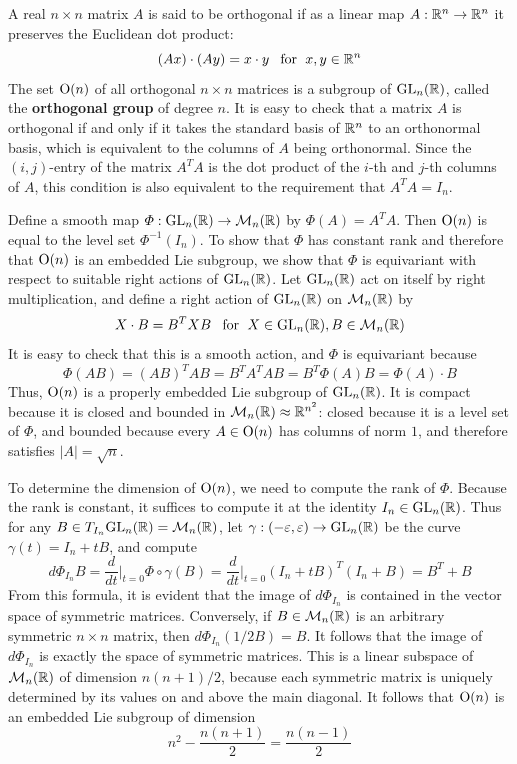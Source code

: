 \begin{example}\label{orthogonal group}
A real $n\times n$ matrix $A$ is said to be orthogonal if as a linear map $A:\mathbb{R}^n\to\mathbb{R}^n$ it preserves the Euclidean dot product:
\[(Ax)\cdot(Ay)=x\cdot y\hspace{8pt}\text{for}\hspace{6pt} x,y\in\mathbb{R}^n\]
The set $\mathrm{O}(n)$ of all orthogonal $n\times n$ matrices is a subgroup of $\mathrm{GL}_n(\mathbb{R})$, called the \textbf{orthogonal group} of degree $n$. It is easy to check that a matrix $A$ is orthogonal if and only if it takes the standard basis of $\mathbb{R}^n$ to an orthonormal basis, which is equivalent to the columns of $A$ being orthonormal. Since the $(i,j)$-entry of the matrix $A^TA$ is the dot product of the $i$-th and $j$-th columns of $A$, this condition is also equivalent to the requirement that $A^TA=I_n$.\par
Define a smooth map $\varPhi:\mathrm{GL}_n(\mathbb{R})\to\mathcal{M}_n(\mathbb{R})$ by $\varPhi(A)=A^TA$. Then $\mathrm{O}(n)$ is equal to the level set $\varPhi^{-1}(I_n)$. To show that $\varPhi$ has constant rank and therefore that $\mathrm{O}(n)$ is an embedded Lie subgroup, we show that $\varPhi$ is equivariant with respect to
suitable right actions of $\mathrm{GL}_n(\mathbb{R})$. Let $\mathrm{GL}_n(\mathbb{R})$ act on itself by right multiplication, and define a right action of $\mathrm{GL}_n(\mathbb{R})$ on $\mathcal{M}_n(\mathbb{R})$ by 
\[X\cdot B=B^TXB\hspace{8pt}\text{for}\hspace{6pt} X\in\mathrm{GL}_n(\mathbb{R}), B\in\mathcal{M}_n(\mathbb{R})\]
It is easy to check that this is a smooth action, and $\varPhi$ is equivariant because
\[\varPhi(AB)=(AB)^TAB=B^TA^TAB=B^T\varPhi(A)B=\varPhi(A)\cdot B\]
Thus, $\mathrm{O}(n)$ is a properly embedded Lie subgroup of $\mathrm{GL}_n(\mathbb{R})$. It is compact because it is closed and bounded in $\mathcal{M}_n(\mathbb{R})\approx\mathbb{R}^{n^2}$: closed because it is a level set of $\varPhi$, and bounded because every $A\in\mathrm{O}(n)$ has columns of norm $1$, and therefore satisfies $|A|=\sqrt{n}$.\par
To determine the dimension of $\mathrm{O}(n)$, we need to compute the rank of $\varPhi$. Because the rank is constant, it suffices to compute it at the identity $I_n\in\mathrm{GL}_n(\mathbb{R})$. Thus for any $B\in T_{I_n}\mathrm{GL}_n(\mathbb{R})=\mathcal{M}_n(\mathbb{R})$, let $\gamma:(-\varepsilon,\varepsilon)\to\mathrm{GL}_n(\mathbb{R})$ be the curve $\gamma(t)=I_n+tB$, and compute
\[d\varPhi_{I_n}B=\frac{d}{dt}\Big|_{t=0}\varPhi\circ\gamma(B)=\frac{d}{dt}\Big|_{t=0}(I_n+tB)^T(I_n+B)=B^T+B\]
From this formula, it is evident that the image of $d\varPhi_{I_n}$ is contained in the vector space of symmetric matrices. Conversely, if $B\in\mathcal{M}_n(\mathbb{R})$ is an arbitrary symmetric $n\times n$ matrix, then $d\varPhi_{I_n}(1/2B)=B$. It follows that the image of $d\varPhi_{I_n}$ is exactly the space of symmetric matrices. This is a linear subspace of $\mathcal{M}_n(\mathbb{R})$ of dimension $n(n+1)/2$, because each symmetric matrix is uniquely determined by its values on and above the main diagonal. It follows that $\mathrm{O}(n)$ is an embedded Lie subgroup of dimension 
\[n^2-\frac{n(n+1)}{2}=\frac{n(n-1)}{2}\]
\end{example}
